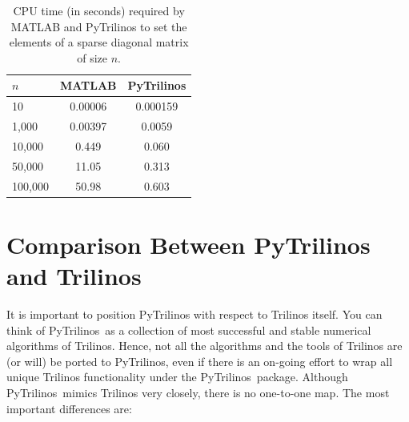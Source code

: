 \documentclass[10pt,relax]{SANDreport}
\newcommand{\PyTrilinos}{{PyTrilinos}}
\begin{document}
\begin{table}
\begin{center}
\begin{tabular}{| l | c | c |}
\hline
$n$ & MATLAB & PyTrilinos \\
\hline
\hline
10      & 0.00006 & 0.000159 \\
1,000   & 0.00397 & 0.0059 \\
10,000  & 0.449   & 0.060 \\
50,000  & 11.05   & 0.313 \\
100,000 & 50.98   & 0.603 \\
\hline
\end{tabular}
\caption{CPU time (in seconds) required by MATLAB and PyTrilinos to set the
  elements of a  sparse diagonal matrix of size $n$.}
\label{tab:matlab_sparse}
\end{center}
\end{table}

\section{Comparison Between PyTrilinos and Trilinos}
\label{sec:comparison_trilinos}

It is  important to position PyTrilinos with respect to Trilinos
itself. You can think of \PyTrilinos\ as a collection of most
successful and stable numerical algorithms of Trilinos.  Hence, not
all the algorithms and the tools of Trilinos are (or will) be ported
to \PyTrilinos, even if there is an on-going effort to wrap all
unique Trilinos functionality under the \PyTrilinos\ package.
Although \PyTrilinos\ mimics Trilinos very closely, there is no
one-to-one map. The most important differences are:
\end{document}
